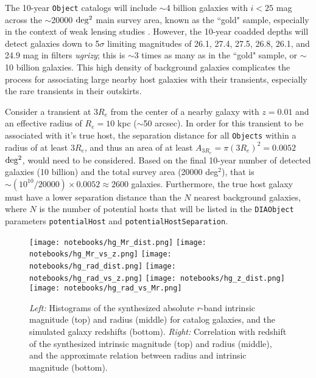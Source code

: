 \documentclass[DM,lsstdraft,authoryear,toc]{lsstdoc}
\begin{document}
The 10-year {\tt Object} catalogs will include $\sim$4 billion galaxies with $i<25$ mag across the $\sim$20000 $\rm deg^2$ main survey area, known as the ``gold" sample, especially in the context of weak lensing studies .
However, the 10-year coadded depths will detect galaxies down to 5$\sigma$ limiting magnitudes of 26.1, 27.4, 27.5, 26.8, 26.1, and 24.9 mag in filters {\it ugrizy}; this is $\sim$3 times as many as in the ``gold" sample, or $\sim$10 billion galaxies.
This high density of background galaxies complicates the process for associating large nearby host galaxies with their transients, especially the rare transients in their outskirts.

Consider a transient at $3R_e$ from the center of a nearby galaxy with $z=0.01$ and an effective radius of $R_e = 10$ kpc ($\sim$50 arcsec).
In order for this transient to be associated with it's true host, the separation distance for all {\tt Objects} within a radius of at least $3R_e$, and thus an area of at least $A_{3R_e} = \pi (3R_e)^2 = 0.0052$ $\rm deg^2$, would need to be considered.
Based on the final 10-year number of detected galaxies (10 billion) and the total survey area (20000 deg$^2$), that is $\sim (10^10 / 20000) \times 0.0052 \approx 2600$ galaxies.
Furthermore, the true host galaxy must have a lower separation distance than the $N$ nearest background galaxies, where $N$ is the number of potential hosts that will be listed in the {\tt DIAObject} parameters {\tt potentialHost} and {\tt potentialHostSeparation}.

\begin{figure}[h]
\begin{center}
\texttt{[image: notebooks/hg\_Mr\_dist.png]}
\texttt{[image: notebooks/hg\_Mr\_vs\_z.png]}
\texttt{[image: notebooks/hg\_rad\_dist.png]}
\texttt{[image: notebooks/hg\_rad\_vs\_z.png]}
\texttt{[image: notebooks/hg\_z\_dist.png]}
\texttt{[image: notebooks/hg\_rad\_vs\_Mr.png]}
\caption{{\it Left:} Histograms of the synthesized absolute $r$-band intrinsic magnitude (top) and radius (middle) for catalog galaxies, and the simulated galaxy redshifts (bottom). {\it Right:} Correlation with redshift of the synthesized intrinsic magnitude (top) and radius (middle), and the approximate relation between radius and intrinsic magnitude (bottom).  \label{fig:simcat}}
\end{center}
\end{figure}
\end{document}
